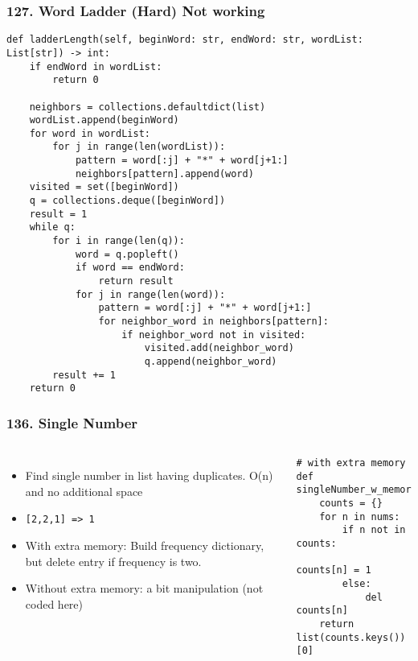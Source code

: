 \begin{frame}[fragile]\frametitle{127. Word Ladder (Hard) Not working}


		\begin{lstlisting}[basicstyle=\scriptsize]
def ladderLength(self, beginWord: str, endWord: str, wordList: List[str]) -> int:
    if endWord in wordList:
        return 0

    neighbors = collections.defaultdict(list)
    wordList.append(beginWord)
    for word in wordList:
        for j in range(len(wordList)):
            pattern = word[:j] + "*" + word[j+1:]
            neighbors[pattern].append(word)
    visited = set([beginWord])
    q = collections.deque([beginWord])
    result = 1
    while q:
        for i in range(len(q)):
            word = q.popleft()
            if word == endWord:
                return result
            for j in range(len(word)):
                pattern = word[:j] + "*" + word[j+1:]
                for neighbor_word in neighbors[pattern]:
                    if neighbor_word not in visited:
                        visited.add(neighbor_word)
                        q.append(neighbor_word)
        result += 1
    return 0
				\end{lstlisting}		

	
\end{frame}

\begin{frame}[fragile]\frametitle{136. Single Number}

	\begin{columns}[T]
	\begin{itemize}
	\item Find single number in list having duplicates. O(n) and no additional space
	\item \lstinline{[2,2,1] => 1}
	\item With extra memory: Build frequency dictionary, but delete entry if frequency is two.
	\item Without extra memory: a bit manipulation (not coded here)
	\end{itemize}
		\begin{lstlisting}[basicstyle=\scriptsize]
# with extra memory
def singleNumber_w_memory(nums):
    counts = {}
    for n in nums:
        if n not in counts:
            counts[n] = 1
        else:
            del counts[n]
    return list(counts.keys())[0]
				\end{lstlisting}		

	\end{columns}
		
\end{frame}

